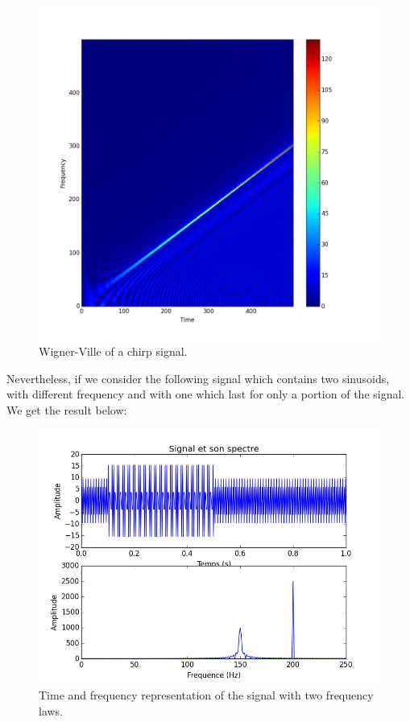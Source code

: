 \begin{figure}[H]
\centering
    \includegraphics[scale=0.5,angle=0]{Images/Chirp_WV.png}
    \caption{Wigner-Ville of a chirp signal.}
    \label{fig:Chirp_WV}
\end{figure}

Nevertheless, if we consider the following signal which contains two sinusoids, with different frequency and with one which last for only a portion of the signal. We get the result below:

\begin{figure}[H]
\centering
    \includegraphics[scale=0.5,angle=0]{Images/SignalSimple.png}
    \caption{Time and frequency representation of the signal with two frequency laws.}
    \label{fig:SignalSimple}
\end{figure}

